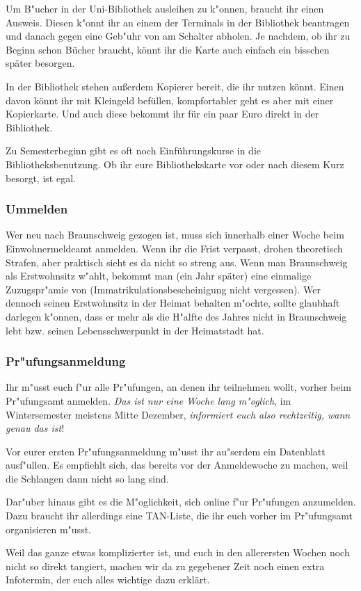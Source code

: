 Um B"ucher in der Uni-Bibliothek ausleihen zu k"onnen, braucht ihr
einen Ausweis. Diesen k"onnt ihr an einem der Terminals in der
Bibliothek beantragen und danach gegen eine Geb"uhr von 
am Schalter abholen. Je nachdem, ob ihr zu Beginn schon Bücher braucht, 
könnt ihr die Karte auch einfach ein bisschen später besorgen.

In der Bibliothek stehen außerdem Kopierer bereit, die ihr nutzen könnt. 
Einen davon könnt ihr mit Kleingeld befüllen, kompfortabler geht es aber 
mit einer Kopierkarte. Und auch diese bekommt ihr für ein paar Euro 
direkt in der Bibliothek.

Zu Semesterbeginn gibt es oft noch Einführungskurse in die 
Bibliotheksbenutzung. Ob ihr eure Bibliothekskarte vor oder nach 
diesem Kurz besorgt, ist egal.

\subsubsection{Ummelden}

Wer neu nach Braunschweig gezogen ist, muss sich innerhalb einer
Woche beim Einwohnermeldeamt anmelden. Wenn ihr die Frist verpasst, 
drohen theoretisch Strafen, aber praktisch sieht es da nicht so 
streng aus. Wenn man Braunschweig als
Erstwohnsitz w"ahlt, bekommt man (ein Jahr später) eine einmalige 
Zuzugspr"amie von
 (Immatrikulationsbescheinigung nicht vergessen). Wer
dennoch seinen Erstwohnsitz in der Heimat behalten m"ochte, sollte
glaubhaft darlegen k"onnen, dass er mehr als die H"alfte des Jahres
nicht in Braunschweig lebt bzw. seinen Lebensschwerpunkt in der
Heimatstadt hat.

\subsubsection{Pr"ufungsanmeldung}

Ihr m"usst euch f"ur alle Pr"ufungen, an denen ihr teilnehmen
wollt, vorher beim Pr"ufungsamt anmelden. \emph{Das ist nur eine
Woche lang m"oglich}, im Wintersemester meistens Mitte Dezember,
\emph{informiert euch also rechtzeitig, wann genau das ist}!

Vor eurer ersten Pr"ufungsanmeldung m"usst ihr au"serdem ein
Datenblatt ausf"ullen. Es empfiehlt sich, das bereits vor der
Anmeldewoche zu machen, weil die Schlangen dann nicht so lang sind.

Dar"uber hinaus gibt es die M"oglichkeit, sich online f"ur
Pr"ufungen anzumelden. Dazu braucht ihr allerdings eine TAN-Liste,
die ihr euch vorher im Pr"ufungsamt organisieren m"usst.

Weil das ganze etwas komplizierter ist, und euch in den allerersten 
Wochen noch nicht so direkt tangiert, machen wir da zu gegebener Zeit 
noch einen extra Infotermin, der euch alles wichtige dazu erklärt.